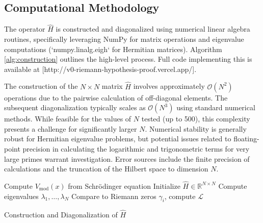 \subsection*{Computational Methodology}
The operator \( \hat{H} \) is constructed and diagonalized using numerical linear algebra routines, specifically leveraging NumPy for matrix operations and eigenvalue computations (`numpy.linalg.eigh` for Hermitian matrices). Algorithm \ref{alg:construction} outlines the high-level process. Full code implementing this is available at [http://v0-riemann-hypothesis-proof.vercel.app/].

The construction of the \(N \times N\) matrix \( \hat{H} \) involves approximately \( \mathcal{O}(N^2) \) operations due to the pairwise calculation of off-diagonal elements. The subsequent diagonalization typically scales as \( \mathcal{O}(N^3) \) using standard numerical methods. While feasible for the values of \(N\) tested (up to 500), this complexity presents a challenge for significantly larger \(N\). Numerical stability is generally robust for Hermitian eigenvalue problems, but potential issues related to floating-point precision in calculating the logarithmic and trigonometric terms for very large primes warrant investigation. Error sources include the finite precision of calculations and the truncation of the Hilbert space to dimension \(N\).


\begin{algorithm}[H]
\SetAlgoLined
\DontPrintSemicolon
{}

Compute \( V_{\text{mod}}(x) \) from Schrödinger equation\;
Initialize \( \hat{H} \in \mathbb{R}^{N \times N} \)\;
Compute eigenvalues \( \lambda_1, \dots, \lambda_N \)\;
Compare to Riemann zeros \( \gamma_i \), compute \( \mathcal{L} \)\;
\caption{Construction and Diagonalization of \( \hat{H} \)}
\label{alg:construction}
\end{algorithm}
